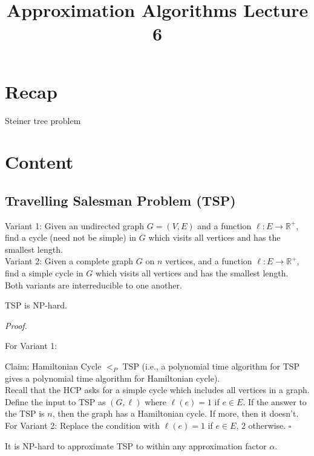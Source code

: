 \documentclass[a4paper]{article}
\title{\textbf{Approximation Algorithms Lecture 6}}
\date{}
\newenvironment{proof}{\begin{breakbox}\textit{Proof.}}{\hfill$\square$\end{breakbox}}
\newcommand{\nl}{\vspace{0.2cm}\\}
\newcommand{\R}{\mathbb{R}}
\begin{document}
\maketitle
\tableofcontents

\section{Recap}

Steiner tree problem

\section{Content}

\subsection{Travelling Salesman Problem (TSP)}

Variant 1: Given an undirected graph $G = (V, E)$ and a function $\ell : E \to \R^+$, find a cycle (need not be simple) in $G$ which visits all vertices and has the smallest length.\nl
Variant 2: Given a complete graph $G$ on $n$ vertices, and a function $\ell : E \to \R^+$, find a simple cycle in $G$ which visits all vertices and has the smallest length.\nl
Both variants are interreducible to one another.

\begin{claim}
    TSP is NP-hard.
\end{claim}

\begin{proof}

    For Variant 1:

    Claim: Hamiltonian Cycle $<_P$ TSP (i.e., a polynomial time algorithm for TSP gives a polynomial time algorithm for Hamiltonian cycle).\nl
    Recall that the HCP asks for a simple cycle which includes all vertices in a graph. Define the input to TSP as $(G, \ell)$ where $\ell(e) = 1$ if $e \in E$. If the answer to the TSP is $n$, then
    the graph has a Hamiltonian cycle. If more, then it doesn't.\nl

    For Variant 2:
    Replace the condition with $\ell(e) = 1$ if $e \in E$, $2$ otherwise.
\end{proof}

\begin{claim}
    It is NP-hard to approximate TSP to within any approximation factor $\alpha$.
\end{claim}
\end{document}

